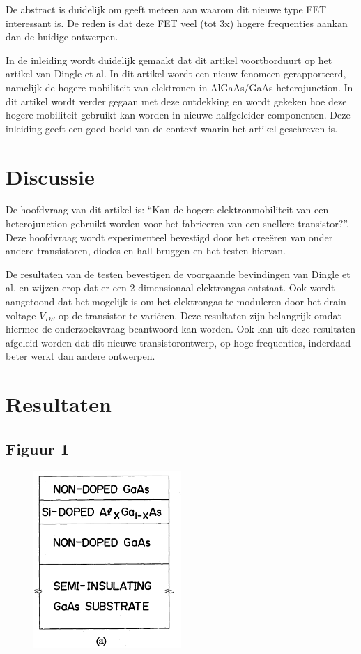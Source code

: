 \documentclass[11pt]{report}
\begin{document}
De abstract is duidelijk om geeft meteen aan waarom dit nieuwe type FET interessant is. De reden is dat deze FET veel (tot 3x) hogere frequenties aankan dan de huidige ontwerpen. 

In de inleiding wordt duidelijk gemaakt dat dit artikel voortborduurt op het artikel van Dingle et al. In dit artikel wordt een nieuw fenomeen gerapporteerd, namelijk de hogere mobiliteit van elektronen in AlGaAs/GaAs heterojunction. In dit artikel wordt verder gegaan met deze ontdekking en wordt gekeken hoe deze hogere mobiliteit gebruikt kan worden in nieuwe halfgeleider componenten. Deze inleiding geeft een goed beeld van de context waarin het artikel geschreven is.

\chapter{Discussie}
De hoofdvraag van dit artikel is: ``Kan de hogere elektronmobiliteit van een heterojunction gebruikt worden voor het fabriceren van een snellere transistor?''. Deze hoofdvraag wordt experimenteel bevestigd door het cree\"eren van onder andere transistoren, diodes en hall-bruggen en het testen hiervan.

De resultaten van de testen bevestigen de voorgaande bevindingen van Dingle et al. en wijzen erop dat er een 2-dimensionaal elektrongas ontstaat. Ook wordt aangetoond dat het mogelijk is om het elektrongas te moduleren door het drain-voltage $V_{DS}$ op de transistor te vari\"eren. Deze resultaten zijn belangrijk omdat hiermee de onderzoeksvraag beantwoord kan worden. Ook kan uit deze resultaten afgeleid worden dat dit nieuwe transistorontwerp, op hoge frequenties, inderdaad beter werkt dan andere ontwerpen.


\chapter{Resultaten}
\section{Figuur 1}
\begin{figure}[h]
\centering
\includegraphics[width=0.5\textwidth]{physical_structure.png}
\caption{}
\end{figure}
\end{document}

